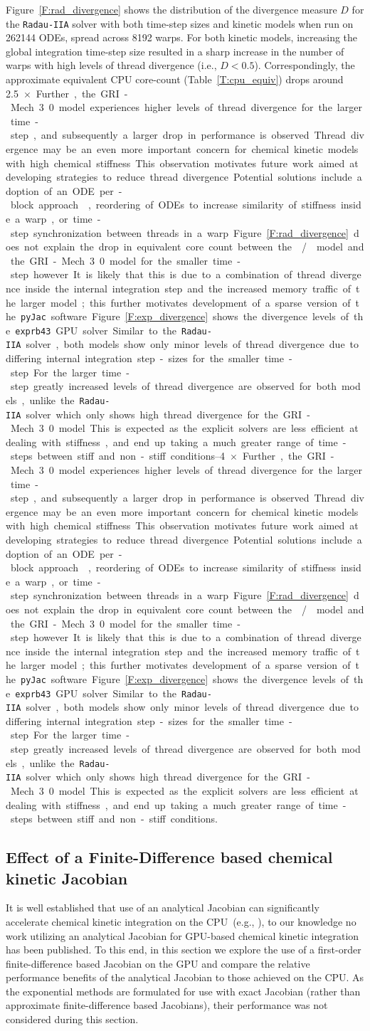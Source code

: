 \documentclass[final,twocolumn]{elsarticle}
\begin{document}
Figure~\ref{F:rad_divergence} shows the distribution of the divergence measure $D$ for the \texttt{Radau-IIA} solver with both time-step sizes and kinetic models when run on \num{262144} ODEs, spread across \num{8192} warps.
For both kinetic models, increasing the global  integration time-step size resulted in a sharp increase in the number of warps with high levels of thread divergence (i.e., $D < 0.5$).
Correspondingly, the approximate equivalent CPU core-count (Table~\ref{T:cpu_equiv}) drops around \SIrange{2.5}{4}{$\times$}.
Further, the GRI-Mech 3.0 model experiences higher levels of thread divergence for the larger time-step, and subsequently a larger drop in performance is observed.
Thread divergence may be an even more important concern for chemical kinetic models with high chemical stiffness.
This observation motivates future work aimed at developing strategies to reduce thread divergence.
Potential solutions include adoption of an ODE per-block approach~\cite{Stone:2013aa}, reordering of ODEs to increase similarity of stiffness inside a warp, or time-step synchronization between threads in a warp.
Figure~\ref{F:rad_divergence} does not explain the drop in equivalent core count between the \slash{} model and the GRI-Mech 3.0 model for the smaller time-step however.
It is likely that this is due to a combination of thread divergence inside the internal integration step and the increased memory traffic of the larger model; this further motivates development of a sparse version of the \texttt{pyJac} software.

Figure~\ref{F:exp_divergence} shows the divergence levels of the \texttt{exprb43} GPU solver.
Similar to the \texttt{Radau-IIA} solver, both models show only minor levels of thread divergence due to differing internal integration step-sizes for the smaller time-step.
For the larger time-step greatly increased levels of thread divergence are observed for both models, unlike the \texttt{Radau-IIA} solver which only shows high thread divergence for the GRI-Mech 3.0 model.
This is expected as the explicit solvers are less efficient at dealing with stiffness, and end up taking a much greater range of time-steps between stiff and non-stiff conditions.

\subsection{Effect of a Finite-Difference based chemical kinetic Jacobian}
It is well established that use of an analytical Jacobian can significantly accelerate chemical kinetic integration on the CPU~(e.g., \cite{Lu:2009gh,stone2014comparison}), to our knowledge no work utilizing an analytical Jacobian for GPU-based chemical kinetic integration has been published.
To this end, in this section we explore the use of a first-order finite-difference based Jacobian on the GPU and compare the relative performance benefits of the analytical Jacobian to those achieved on the CPU.
As the exponential methods are formulated for use with exact Jacobian (rather than approximate finite-difference based Jacobians), their performance was not considered during this section.
\end{document}
